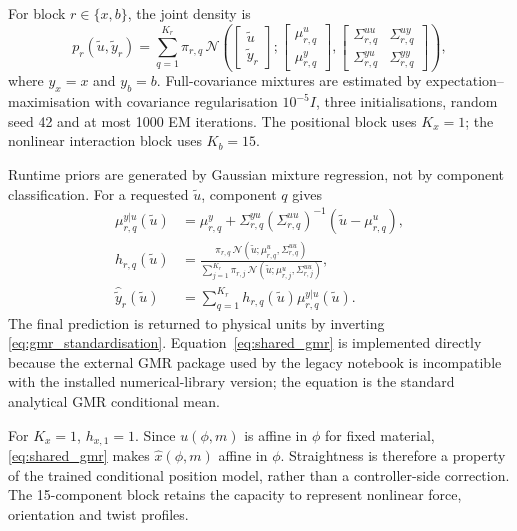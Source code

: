 \documentclass[11pt,a4paper]{article}
\begin{document}
For block $r\in\{x,b\}$, the joint density is
\begin{equation}
p_r(\tilde u,\tilde y_r)
=\sum_{q=1}^{K_r}\pi_{r,q}\,
\mathcal N\!\left(
\begin{bmatrix}\tilde u\\\tilde y_r\end{bmatrix};
\begin{bmatrix}\mu^u_{r,q}\\\mu^y_{r,q}\end{bmatrix},
\begin{bmatrix}
\Sigma^{uu}_{r,q}&\Sigma^{uy}_{r,q}\\
\Sigma^{yu}_{r,q}&\Sigma^{yy}_{r,q}
\end{bmatrix}\right),
\label{eq:shared_gmm}
\end{equation}
where $y_x=x$ and $y_b=b$. Full-covariance mixtures are estimated by
expectation--maximisation with covariance regularisation
$10^{-5}I$, three initialisations, random seed 42 and at most 1000 EM
iterations. The positional block uses $K_x=1$; the nonlinear interaction block
uses $K_b=15$.

Runtime priors are generated by Gaussian mixture regression, not by component
classification. For a requested $\tilde u$, component $q$ gives
\begin{align}
\mu^{y|u}_{r,q}(\tilde u)
&=\mu^y_{r,q}
+\Sigma^{yu}_{r,q}(\Sigma^{uu}_{r,q})^{-1}
(\tilde u-\mu^u_{r,q}),\\
h_{r,q}(\tilde u)
&=\frac{\pi_{r,q}\,
\mathcal N(\tilde u;\mu^u_{r,q},\Sigma^{uu}_{r,q})}
{\sum_{j=1}^{K_r}\pi_{r,j}\,
\mathcal N(\tilde u;\mu^u_{r,j},\Sigma^{uu}_{r,j})},\\
\hat{\tilde y}_r(\tilde u)
&=\sum_{q=1}^{K_r}h_{r,q}(\tilde u)
\mu^{y|u}_{r,q}(\tilde u).
\label{eq:shared_gmr}
\end{align}
The final prediction is returned to physical units by inverting
\eqref{eq:gmr_standardisation}. Equation~\eqref{eq:shared_gmr} is implemented
directly because the external GMR package used by the legacy notebook is
incompatible with the installed numerical-library version; the equation is
the standard analytical GMR conditional mean.

For $K_x=1$, $h_{x,1}=1$. Since $u(\phi,m)$ is affine in $\phi$ for fixed
material, \eqref{eq:shared_gmr} makes $\hat x(\phi,m)$ affine in $\phi$.
Straightness is therefore a property of the trained conditional position
model, rather than a controller-side correction. The 15-component block
retains the capacity to represent nonlinear force, orientation and twist
profiles.
\end{document}
